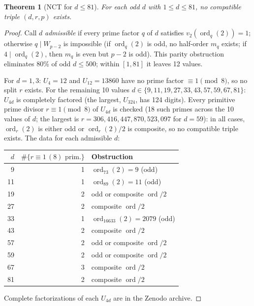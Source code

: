 \documentclass[12pt]{article}
\theoremstyle{plain}
\newtheorem{theorem}{Theorem}[section]
\theoremstyle{definition}
\theoremstyle{remark}
\begin{document}
\begin{theorem}[{NCT for $d \leq 81$}]\label{thm:NCT-81}
For each odd \(d\) with
\(1 \leq d \leq 81\), no compatible triple \((d, r, p)\) exists.
\end{theorem}


\begin{proof}
Call \(d\) \emph{admissible} if every prime factor \(q\) of \(d\)
satisfies \(v_2(\operatorname{ord}_q(2)) = 1\); otherwise
\(q \mid W_{p-2}\) is impossible (if \(\operatorname{ord}_q(2)\) is
odd, no half-order \(m_q\) exists; if
\(4 \mid \operatorname{ord}_q(2)\), then \(m_q\) is even but
\(p - 2\) is odd). This parity obstruction eliminates 80\% of odd
\(d \leq 500\); within \([1, 81]\) it leaves 12 values.

For \(d = 1, 3\): \(U_4 = 12\) and \(U_{12} = 13860\) have no prime
factor \(\equiv 1 \pmod{8}\), so no split \(r\) exists. For the
remaining 10 values \(d \in \{9, 11, 19, 27, 33, 43, 57, 59,
67, 81\}\): \(U_{4d}\) is completely factored (the largest,
\(U_{324}\), has 124 digits). Every primitive prime divisor
\(r \equiv 1 \pmod{8}\) of \(U_{4d}\) is checked (18 such primes
across the 10 values of \(d\); the largest is
\(r = 306{,}416{,}447{,}870{,}523{,}097\) for \(d = 59\)): in all cases,
\(\operatorname{ord}_r(2)\) is either odd or
\(\operatorname{ord}_r(2)/2\) is composite, so no compatible triple
exists. The data for each admissible \(d\):

\begin{center}
\small
\begin{tabular}{rrl}
\hline
\(d\) & \(\#\{r \equiv 1\,(8) \text{ prim.}\}\) & Obstruction \\
\hline
9 & 1 & \(\operatorname{ord}_{73}(2) = 9\) (odd) \\
11 & 1 & \(\operatorname{ord}_{89}(2) = 11\) (odd) \\
19 & 2 & odd or composite \(\operatorname{ord}/2\) \\
27 & 2 & composite \(\operatorname{ord}/2\) \\
33 & 1 & \(\operatorname{ord}_{16633}(2) = 2079\) (odd) \\
43 & 2 & composite \(\operatorname{ord}/2\) \\
57 & 2 & odd or composite \(\operatorname{ord}/2\) \\
59 & 2 & odd or composite \(\operatorname{ord}/2\) \\
67 & 3 & composite \(\operatorname{ord}/2\) \\
81 & 2 & composite \(\operatorname{ord}/2\) \\
\hline
\end{tabular}
\end{center}

\noindent Complete factorizations of each \(U_{4d}\) are in the Zenodo
archive.
\end{proof}
\end{document}

